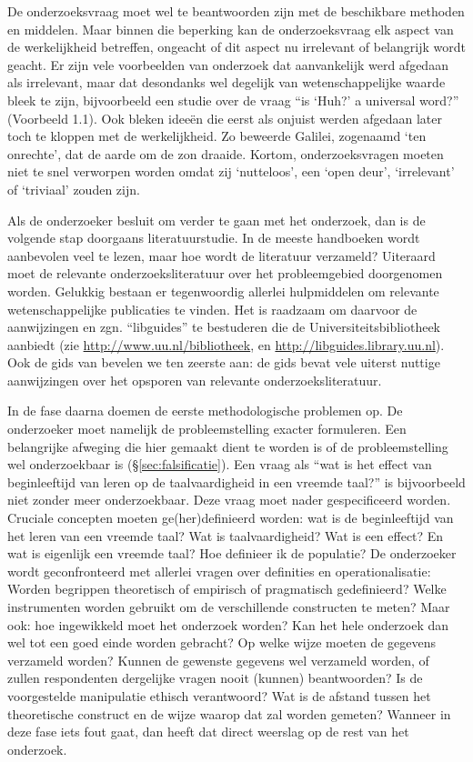 \documentclass[
]{book}
\begin{document}
De onderzoeksvraag moet wel te beantwoorden zijn met de beschikbare
methoden en middelen. Maar binnen die beperking kan de onderzoeksvraag
elk aspect van de werkelijkheid betreffen, ongeacht of dit aspect nu
irrelevant of belangrijk wordt geacht. Er zijn vele voorbeelden van
onderzoek dat aanvankelijk werd afgedaan als irrelevant, maar dat
desondanks wel degelijk van wetenschappelijke waarde bleek te zijn,
bijvoorbeeld een studie over de vraag ``is `Huh?' a universal word?''
\citep{DTE13} (Voorbeeld 1.1).
Ook bleken ideeën die eerst als onjuist werden afgedaan later toch te kloppen met de werkelijkheid. Zo beweerde Galilei, zogenaamd `ten onrechte', dat de aarde om de zon draaide. Kortom, onderzoeksvragen moeten niet te snel verworpen worden omdat zij `nutteloos', een `open deur', `irrelevant' of `triviaal' zouden zijn.

Als de onderzoeker besluit om verder te gaan met het onderzoek, dan is
de volgende stap doorgaans literatuurstudie. In de meeste handboeken
wordt aanbevolen veel te lezen, maar hoe wordt de literatuur verzameld?
Uiteraard moet de relevante onderzoeksliteratuur over het probleemgebied
doorgenomen worden. Gelukkig bestaan er tegenwoordig allerlei
hulpmiddelen om relevante wetenschappelijke publicaties te vinden. Het
is raadzaam om daarvoor de aanwijzingen en zgn. ``libguides'' te
bestuderen die de Universiteitsbibliotheek aanbiedt (zie
\url{http://www.uu.nl/bibliotheek}, en \url{http://libguides.library.uu.nl}).
Ook de gids van \citep{Sand11} bevelen we ten zeerste aan: de gids bevat vele uiterst
nuttige aanwijzingen over het opsporen van relevante
onderzoeksliteratuur.

In de fase daarna doemen de eerste methodologische problemen op. De
onderzoeker moet namelijk de probleemstelling exacter formuleren. Een
belangrijke afweging die hier gemaakt dient te worden is of de
probleemstelling wel onderzoekbaar is (§\ref{sec:falsificatie}).
Een vraag als ``wat is het effect van
beginleeftijd van leren op de taalvaardigheid in een vreemde taal?'' is
bijvoorbeeld niet zonder meer onderzoekbaar. Deze vraag moet nader
gespecificeerd worden. Cruciale concepten moeten ge(her)definieerd
worden: wat is de beginleeftijd van het leren van een vreemde taal? Wat is taalvaardigheid? Wat is een effect? En wat is eigenlijk een vreemde taal? Hoe definieer ik de populatie?
De onderzoeker wordt geconfronteerd
met allerlei vragen over definities en operationalisatie: Worden
begrippen theoretisch of empirisch of pragmatisch gedefinieerd? Welke
instrumenten worden gebruikt om de verschillende constructen te meten?
Maar ook: hoe ingewikkeld moet het onderzoek worden? Kan het hele
onderzoek dan wel tot een goed einde worden gebracht? Op welke wijze
moeten de gegevens verzameld worden? Kunnen de gewenste gegevens wel
verzameld worden, of zullen respondenten dergelijke vragen nooit
(kunnen) beantwoorden? Is de voorgestelde manipulatie ethisch
verantwoord? Wat is de afstand tussen het theoretische construct en de
wijze waarop dat zal worden gemeten? Wanneer in deze fase iets fout
gaat, dan heeft dat direct weerslag op de rest van het onderzoek.
\end{document}
